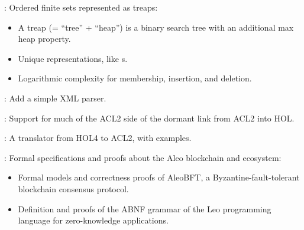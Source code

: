 \begin{frame}

\newlibtitle

:
Ordered finite sets represented as treaps:
\begin{itemize}
\item A treap (= ``tree'' + ``heap'') is a binary search tree with an
      additional max heap property.
\item Unique representations, like s.
\item Logarithmic complexity for membership, insertion, and deletion.
\end{itemize}

\end{frame}


\begin{frame}

\newlibtitle

:
Add a simple XML parser.

\end{frame}


\begin{frame}

\newlibtitle

:
Support for much of the ACL2 side of the dormant link from ACL2 into HOL.

\separation

:
A translator from HOL4 to ACL2, with examples.

\end{frame}


\begin{frame}

\newlibtitle

:
Formal specifications and proofs about the Aleo blockchain and ecosystem:
\begin{itemize}
\item Formal models and correctness proofs of AleoBFT,
      a Byzantine-fault-tolerant blockchain consensus protocol.
\item Definition and proofs of the ABNF grammar of
      the Leo programming language for zero-knowledge applications.
\end{itemize}

\end{frame}

